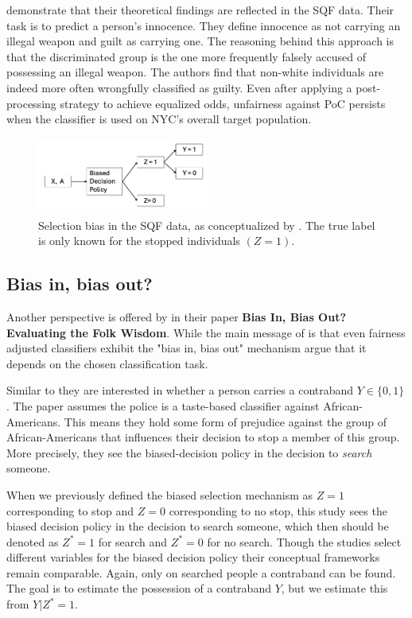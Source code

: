 \cite{kallus2018} demonstrate that their theoretical findings are reflected in the SQF data. Their task is to predict a person's innocence. They define innocence as not carrying an illegal weapon and guilt as carrying one. The reasoning behind this approach is that the discriminated group is the one more frequently falsely accused of possessing an illegal weapon. The authors find that non-white individuals are indeed more often wrongfully classified as guilty. Even after applying a post-processing strategy to achieve equalized odds, unfairness against PoC persists when the classifier is used on NYC’s overall target population.
\newpage
\begin{figure}[htpb]
    \includegraphics[width=0.5\textwidth]{../figures/selection_bias.png}
    \caption{Selection bias in the SQF data, as conceptualized by \cite{kallus2018}. The true label is only known for the stopped individuals $(Z = 1)$.}
    \label{fig:selection_bias}
\end{figure}

\subsection{Bias in, bias out?}

Another perspective is offered by \cite{rambachan2016} in their paper \textbf{Bias In, Bias Out? Evaluating the Folk Wisdom}.
While the main message of \cite{kallus2018} is that even fairness adjusted classifiers exhibit the "bias in, bias out" mechanism \cite{rambachan2016} argue that it depends on the chosen classification task.

Similar to \cite{kallus2018} they are interested in whether a person carries a contraband $Y \in \{0, 1\}$. The paper assumes the police is a taste-based classifier against African-Americans. This means they hold some form of prejudice against the group of African-Americans that influences their decision to stop a member of this group. More precisely, they see the biased-decision policy in the decision to \textit{search} someone.\par
When we previously defined the biased selection mechanism as $Z=1$ corresponding to stop and $Z=0$ corresponding to no stop, this study sees the biased decision policy in the decision to search someone, which then should be denoted as $Z^*=1$ for search and $Z^*=0$ for no search. Though the studies select different variables for the biased decision policy their conceptual frameworks remain comparable.
Again, only on searched people a contraband can be found. The goal is to estimate the possession of a contraband $Y$, but we estimate this from $Y | Z^*=1$.\par

